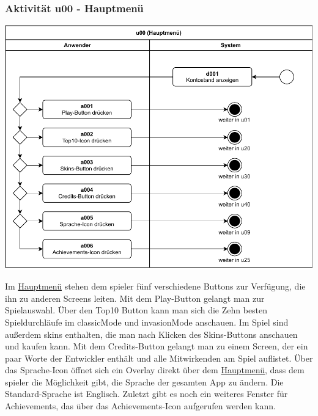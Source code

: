 

\subsubsection{Aktivität u00 - Hauptmenü}

\vspace*{1cm}

\includegraphics[width=\linewidth]{diagramme/pdf/UML-Activity-u00.pdf}
\label{fig:dia:mainMenu}
\vspace*{0.5cm}


Im \hyperref[fig:dia:mainMenu]{Hauptmenü} stehen dem \gls{spieler} fünf verschiedene Buttons zur Verfügung, die ihn zu anderen Screens leiten. Mit dem Play-Button gelangt man zur Spielauswahl. Über den \gls{Top10} Button kann man sich die Zehn besten Spieldurchläufe im \gls{classicMode} und \gls{invasionMode} anschauen. Im Spiel sind außerdem \gls{skin}s enthalten, die man nach Klicken des Skins-Buttons anschauen und kaufen kann. Mit dem Credits-Button gelangt man zu einem Screen, der ein paar Worte der Entwickler enthält und alle Mitwirkenden am Spiel auflistet. Über das Sprache-Icon öffnet sich ein Overlay direkt über dem \hyperref[fig:dia:mainMenu]{Hauptmenü}, dass dem \gls{spieler} die Möglichkeit gibt, die Sprache der gesamten App zu ändern. Die Standard-Sprache ist Englisch. Zuletzt gibt es noch ein weiteres Fenster für Achievements, das über das Achievements-Icon aufgerufen werden kann.


\clearpage

